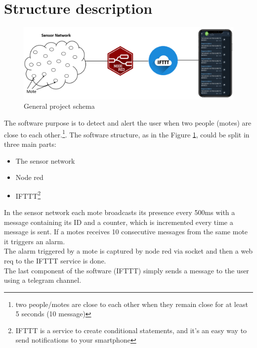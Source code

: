 \documentclass{article}
\begin{document}
		\section{Structure description} %
		\begin{figure}[h!]
         \begin{center}
        \includegraphics[width=1\textwidth]{./general_schema.png}            
        \end{center}
        \caption{General project schema}
        \label{fig:schema}
        \end{figure}
        The software purpose is to detect and alert the user when two people (motes) are close to each other.\footnote{two people/motes are close to each other when they remain close for at least 5 seconds (10 message)}.
The software structure, as in the Figure \ref{fig:schema}, could be split in three main parts:
\begin{itemize}
    \item The sensor network
    \item Node red
    \item IFTTT\footnote{IFTTT is a service to create conditional statements, and it’s an easy way to send notifications to your smartphone}
\end{itemize}
In the sensor network each mote broadcasts its presence every 500ms with a message containing its ID and a counter, which is incremented every time a message is sent. If a motes receives 10 consecutive messages from the same mote it triggers an alarm.\\
The alarm triggered by a mote is captured by node red via socket and then a web req to the IFTTT service is done.\\
The last component of the software (IFTTT) simply sends a message to the user using  a telegram channel. 
\end{document}
